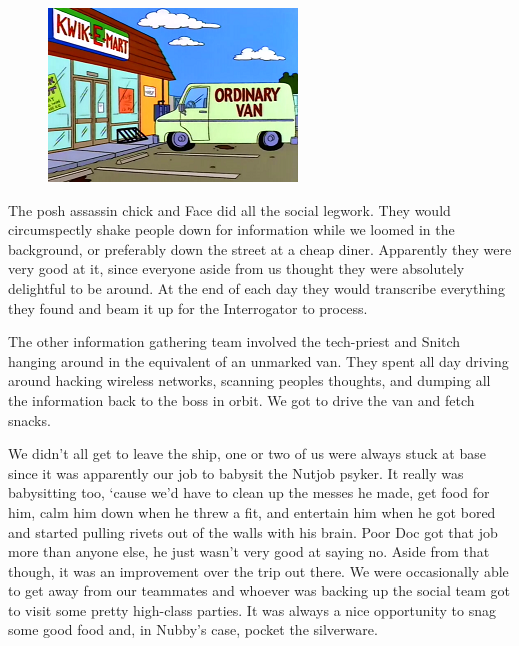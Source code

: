 \begin{figure}
	\begin{center}
		\includegraphics[width=\figwidth]{pics/3/8.png}
	\end{center}
\end{figure}
The posh assassin chick and Face did all the social legwork. 
They would circumspectly shake people down for information while we loomed in the background, or preferably down the street at a cheap diner. 
Apparently they were very good at it, since everyone aside from us thought they were absolutely delightful to be around. 
At the end of each day they would transcribe everything they found and beam it up for the Interrogator to process. 

The other information gathering team involved the tech-priest and Snitch hanging around in the equivalent of an unmarked van. 
They spent all day driving around hacking wireless networks, scanning peoples thoughts, and dumping all the information back to the boss in orbit. 
We got to drive the van and fetch snacks.

We didn’t all get to leave the ship, one or two of us were always stuck at base since it was apparently our job to babysit the Nutjob psyker. 
It really was babysitting too, ‘cause we’d have to clean up the messes he made, get food for him, calm him down when he threw a fit, and entertain him when he got bored and started pulling rivets out of the walls with his brain. 
Poor Doc got that job more than anyone else, he just wasn’t very good at saying no. 
Aside from that though, it was an improvement over the trip out there. 
We were occasionally able to get away from our teammates and whoever was backing up the social team got to visit some pretty high-class parties. 
It was always a nice opportunity to snag some good food and, in Nubby’s case, pocket the silverware.


